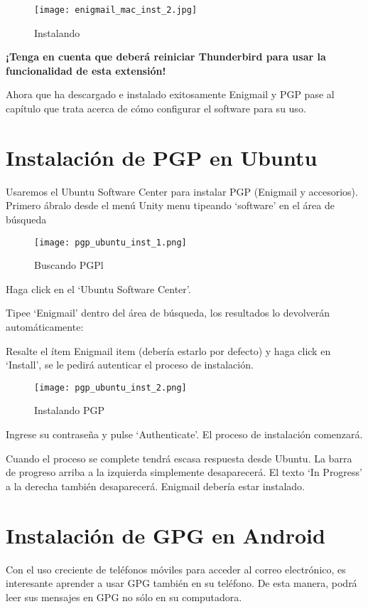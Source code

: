 \documentclass[10pt,a5paper,twoside,,]{book}
\begin{document}
\begin{figure}[htbp]
\centering
\texttt{[image: enigmail\_mac\_inst\_2.jpg]}
\caption{Instalando}
\end{figure}

\textbf{¡Tenga en cuenta que deberá reiniciar Thunderbird para usar la
funcionalidad de esta extensión!}

Ahora que ha descargado e instalado exitosamente Enigmail y PGP pase al
capítulo que trata acerca de cómo configurar el software para su uso.

\chapter{Instalación de PGP en
Ubuntu}\label{instalaciuxf3n-de-pgp-en-ubuntu}

Usaremos el Ubuntu Software Center para instalar PGP (Enigmail y
accesorios). Primero ábralo desde el menú Unity menu tipeando `software'
en el área de búsqueda

\begin{figure}[htbp]
\centering
\texttt{[image: pgp\_ubuntu\_inst\_1.png]}
\caption{Buscando PGPl}
\end{figure}

Haga click en el `Ubuntu Software Center'.

Tipee `Enigmail' dentro del área de búsqueda, los resultados lo
devolverán automáticamente:

Resalte el ítem Enigmail item (debería estarlo por defecto) y haga click
en `Install', se le pedirá autenticar el proceso de instalación.

\begin{figure}[htbp]
\centering
\texttt{[image: pgp\_ubuntu\_inst\_2.png]}
\caption{Instalando PGP}
\end{figure}

Ingrese su contraseña y pulse `Authenticate'. El proceso de instalación
comenzará.

Cuando el proceso se complete tendrá escasa respuesta desde Ubuntu. La
barra de progreso arriba a la izquierda simplemente desaparecerá. El
texto `In Progress' a la derecha también desaparecerá. Enigmail debería
estar instalado.

\chapter{Instalación de GPG en
Android}\label{instalaciuxf3n-de-gpg-en-android}

Con el uso creciente de teléfonos móviles para acceder al correo
electrónico, es interesante aprender a usar GPG también en su teléfono.
De esta manera, podrá leer sus mensajes en GPG no sólo en su
computadora.
\end{document}
